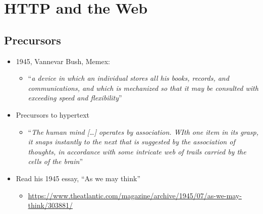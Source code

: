 \chapter{HTTP and the Web}
\section{Precursors}
\begin{itemize}[nosep]
    \item 1945, Vannevar Bush, Memex:
          \begin{itemize}[nosep]
              \item ``\textit{a device in which an individual stores all his books, records, and communications, and which is mechanized so that it may be consulted with exceeding speed and flexibility}''
          \end{itemize}
    \item Precursors to hypertext
          \begin{itemize}[nosep]
              \item ``\textit{The human mind [\dots] operates by association. WIth one item in its grasp, it snaps instantly to the next that is suggested by the association of thoughts, in accordance with some intricate web of trails carried by the cells of the brain}''
          \end{itemize}
    \item Read his 1945 essay, ``As we may think''
          \begin{itemize}[nosep]
              \item \url{https://www.theatlantic.com/magazine/archive/1945/07/as-we-may-think/303881/}
          \end{itemize}
\end{itemize}
